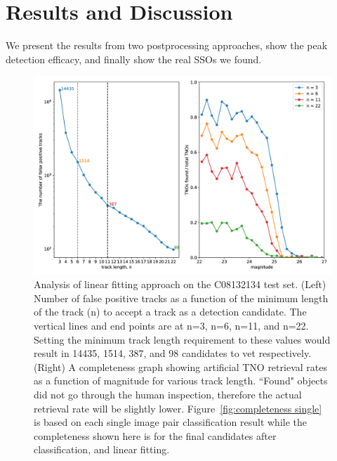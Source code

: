 \documentclass{aastex631}
\begin{document}

\section{Results and Discussion}
\label{sect: Results}

We present the results from two postprocessing approaches, show the peak detection efficacy, and finally show the real SSOs we found.

\begin{figure}
    \centering
    \includegraphics[width=\textwidth,keepaspectratio]{Figures/completeness_after_linear_fitting.png}
    \caption{Analysis of linear fitting approach on the C08132134 test set. (Left) Number of false positive tracks as a function of the minimum length of the track (n) to accept a track as a detection candidate.
    The vertical lines and end points are at n=3, n=6, n=11, and n=22.
    Setting the minimum track length requirement to these values would result in 14435, 1514, 387, and 98 candidates to vet respectively.
    (Right) A completeness graph showing artificial TNO retrieval rates as a function of magnitude for various track length.
    ``Found" objects did not go through the human inspection, therefore the actual retrieval rate will be slightly lower.
    Figure~\ref{fig:completeness single} is based on each single image pair classification result while the completeness shown here is for the final candidates after classification, and linear fitting.
    }
    \label{fig:completeness after Linear Fitting}
\end{figure}

\end{document}

